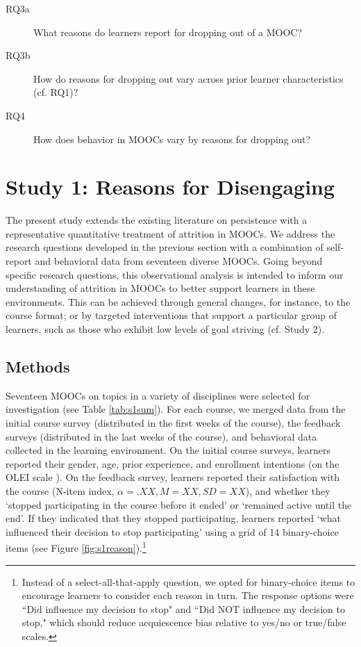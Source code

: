 \documentclass{sigchi}\usepackage[]{graphicx}\usepackage[]{color}
\begin{document}
\begin{description}
\item[RQ3a] What reasons do learners report for dropping out of a MOOC?
\item[RQ3b] How do reasons for dropping out vary across prior learner characteristics (cf. RQ1)?
\item[RQ4] How does behavior in MOOCs vary by reasons for dropping out?
\end{description}  

\section{Study 1: Reasons for Disengaging}

The present study extends the existing literature on persistence with a representative quantitative treatment of attrition in MOOCs. We address the research questions developed in the previous section with a combination of self-report and behavioral data from seventeen diverse MOOCs. Going beyond specific research questions, this observational analysis is intended to inform our understanding of attrition in MOOCs to better support learners in these environments. This can be achieved through general changes, for instance, to the course format; or by targeted interventions that support a particular group of learners, such as those who exhibit low levels of goal striving (cf. Study 2).

\subsection{Methods}

Seventeen MOOCs on topics in a variety of disciplines were selected for investigation (see Table \ref{tab:s1sum}). For each course, we merged data from the initial course survey (distributed in the first weeks of the course), the feedback surveys (distributed in the last weeks of the course), and behavioral data collected in the learning environment. 
On the initial course surveys, learners reported their gender, age, prior experience, and enrollment intentions (on the OLEI scale \cite{kizilcec2015motivation}). On the feedback survey, learners reported their satisfaction with the course (N-item index, $\alpha=.XX, M=XX, SD=XX$), and whether they `stopped participating in the course before it ended' or `remained active until the end'. If they indicated that they stopped participating, learners reported `what influenced their decision to stop participating' using a grid of 14 binary-choice items (see Figure \ref{fig:s1reason}).\footnote{Instead of a select-all-that-apply question, we opted for binary-choice items to encourage learners to consider each reason in turn. The response options were ``Did influence my decision to stop" and ``Did NOT influence my decision to stop," which should reduce acquiescence bias relative to yes/no or true/false scales.}
\end{document}
